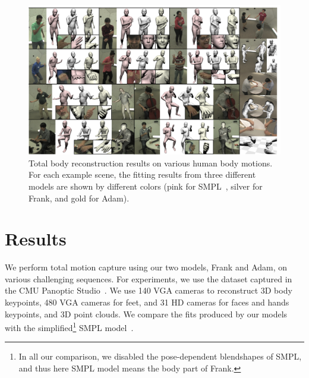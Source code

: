 
\begin{figure}[t]
	\includegraphics[width=\textwidth]{tbc_figures/Qualitative_180325.jpg}
	\caption{Total body reconstruction results on various human body motions. For each example scene, the fitting results from three different models are shown by different colors (pink for SMPL~\cite{Loper2015}, silver for Frank, and gold for Adam). 
	}
	\label{fig:qualitativeResults}
\end{figure}
%

\section{Results}
We perform total motion capture using our two models, Frank and Adam, on various challenging sequences. For experiments, we use the dataset captured in the CMU Panoptic Studio~\cite{Joo-15, joo2017panoptic}. We use 140 VGA cameras to reconstruct 3D body keypoints, 480 VGA cameras for feet, and 31 HD cameras for faces and hands keypoints, and 3D point clouds. We compare the fits produced by our models with the simplified\footnote{In all our comparison, we disabled the pose-dependent blendshapes of SMPL, and thus here SMPL model means the body part of Frank.} SMPL model~\cite{Loper2015}. %

